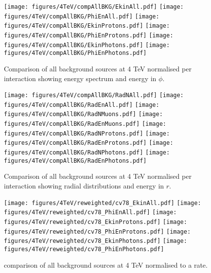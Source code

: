 \clearpage
\begin{figure}
\begin{center}
  \texttt{[image: figures/4TeV/compAllBKG/EkinAll.pdf]}
  \texttt{[image: figures/4TeV/compAllBKG/PhiEnAll.pdf]}
  \texttt{[image: figures/4TeV/compAllBKG/EkinProtons.pdf]}
  \texttt{[image: figures/4TeV/compAllBKG/PhiEnProtons.pdf]}
  \texttt{[image: figures/4TeV/compAllBKG/EkinPhotons.pdf]}
  \texttt{[image: figures/4TeV/compAllBKG/PhiEnPhotons.pdf]}
\end{center}
\vspace{-0.6cm}
 \caption{Comparison of all background sources at 4 TeV normalised per interaction showing energy spectrum and energy in $\phi$.
  \label{fig:compAllBKG_perInt1}}
\end{figure}

\begin{figure}
\begin{center}
  \texttt{[image: figures/4TeV/compAllBKG/RadNAll.pdf]}
  \texttt{[image: figures/4TeV/compAllBKG/RadEnAll.pdf]}
  \texttt{[image: figures/4TeV/compAllBKG/RadNMuons.pdf]}
  \texttt{[image: figures/4TeV/compAllBKG/RadEnMuons.pdf]}
  \texttt{[image: figures/4TeV/compAllBKG/RadNProtons.pdf]}
  \texttt{[image: figures/4TeV/compAllBKG/RadEnProtons.pdf]}
  \texttt{[image: figures/4TeV/compAllBKG/RadNPhotons.pdf]}
  \texttt{[image: figures/4TeV/compAllBKG/RadEnPhotons.pdf]}
\end{center}
\vspace{-0.6cm}
 \caption{Comparison of all background sources at 4 TeV normalised per interaction showing radial distributions and energy in $r$.
  \label{fig:compAllBKG_perInt2}}
\end{figure}

\begin{figure}
\begin{center}
  \texttt{[image: figures/4TeV/reweighted/cv78\_EkinAll.pdf]}
  \texttt{[image: figures/4TeV/reweighted/cv78\_PhiEnAll.pdf]}
  \texttt{[image: figures/4TeV/reweighted/cv78\_EkinProtons.pdf]}
  \texttt{[image: figures/4TeV/reweighted/cv78\_PhiEnProtons.pdf]}
  \texttt{[image: figures/4TeV/reweighted/cv78\_EkinPhotons.pdf]}
  \texttt{[image: figures/4TeV/reweighted/cv78\_PhiEnPhotons.pdf]}
\end{center}
\vspace{-0.6cm}
 \caption{comparison of all background sources at 4 TeV normalised to a rate.
  \label{compAllBKG4TeV_rates}}
\end{figure}

